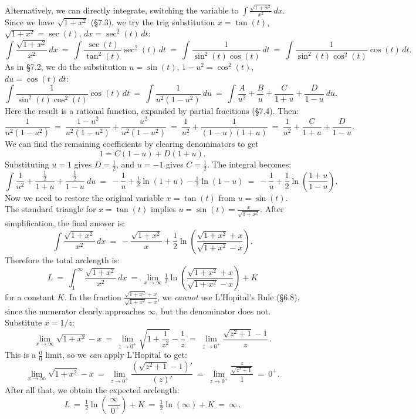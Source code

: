 \documentclass[11pt]{article}
\begin{document}
\newpage

\noindent
Alternatively, we can directly integrate, 
switching the variable to $\int\! \frac{\sqrt{1+x^2}}{x^2}\,dx$. 
Since we have $\sqrt{1{+}x^2}$ (\S7.3), we try the trig substitution 
$x = \tan(t)$, $\sqrt{1{+}x^2}=\sec(t)$, $dx = \sec^2(t)\,dt$:
$$
\int\! \frac{\sqrt{1+x^2}}{x^2}\,dx
\ =\ 
\int\! \frac{\sec(t)}{\tan^2(t)}\sec^2(t)\,dt
\ = \ 
\int\! \frac{1}{\sin^2(t)\cos(t)}\,dt
\ = \ 
\int\! \frac{1}{\sin^2(t)\cos^2(t)}\cos(t)\,dt.
$$
As in \S7.2, we do the substitution $u=\sin(t)$, $1{-}u^2 = \cos^2(t)$, $du = \cos(t)\,dt$:
$$
\int\! \frac{1}{\sin^2(t)\cos^2(t)}\cos(t)\,dt
\ =\ 
\int\! \frac{1}{u^2(1{-}u^2)}\ du 
\ =\ \int\! \frac{A}{u^2}+\frac{B}{u}+\frac{C}{1{+}u}+\frac{D}{1{-}u}\ du.
$$
Here the result is a rational function, expanded by partial fracitions (\S7.4).
Then: 
$$
\frac{1}{u^2(1{-}u^2)}
\ =\ 
 \frac{1{-}u^2}{u^2(1{-}u^2)} + \frac{u^2}{u^2(1{-}u^2)}
 \ =\ \frac{1}{u^2} + \frac{1}{(1{-}u)(1{+}u)}
  \ =\ \frac{1}{u^2} + \frac{C}{1{+}u}+\frac{D}{1{-}u}.
$$
We can find the remaining coefficients by clearing denominators to get 
$$1= C(1{-}u)+D(1{+}u).$$
Substituting $u = 1$ gives $D=\frac12$, and $u=-1$ gives $C=\frac12$.
The integral becomes:
$$
\int \frac{1}{u^2}+\frac{\frac12}{1{+}u}+\frac{\frac12}{1{-}u}\ du
\ =\ 
-\frac{1}{u} + \tfrac12 \ln(1{+}u) - \tfrac12 \ln(1{-}u)
\ =\ 
-\frac{1}{u} + \frac12 \ln\!\left(\frac{1{+}u}{1{-}u}\right).
$$
Now we need to restore the original variable $x=\tan(t)$ from $u=\sin(t)$.
The standard triangle for $x=\tan(t)$ implies $u=\sin(t) = \frac{x}{\sqrt{1+x^2}}$.
After simplification, the final answer is:
$$
\int\! \frac {\sqrt{1{+}x^2}} {x^2}\,dx
\ =\ -\frac{\sqrt{1{+}x^2}}x 
+ \frac12\ln\!\left(\!\frac {\sqrt{1{+}x^2}+x} {\sqrt{1{+}x^2}-x} \!\right).
$$
Therefore the total arclength is:
$$
L \ =\ 
\int_1^\infty\! \frac {\sqrt{1{+}x^2}} {x^2}\,dx
\ =\ 
\lim_{x\to\infty} \tfrac12   \ln\!\left(\!\frac {\sqrt{1{+}x^2}+x} {\sqrt{1{+}x^2}-x} \!\right)
+ K
$$
for a constant $K$.  In the fraction $\frac {\sqrt{1{+}x^2}+x} {\sqrt{1{+}x^2}-x}$, 
we {\it cannot} use L'Hopital's Rule (\S6.8), 
since the numerator clearly approaches $\infty$,
but the denominator does not. Substitute $x=1/z$:
$$
\lim_{x\to\infty} \sqrt{1{+}x^2}-x \ =\ 
\lim_{z\to0^+}\! \sqrt{1{+}\frac1{z^2}}-\frac 1z \ =\ 
\lim_{z\to0^+}\! \frac{\sqrt{z^2{+}1}-1}z\,. 
$$
This is a $\frac 00$ limit, so we {\it can} apply L'Hopital to get:
$$
\lim_{x\to\infty} \sqrt{1{+}x^2}-x 
\ =\ \lim_{z\to0^+}\! \frac{(\sqrt{z^2{+}1}-1)'}{(z)'}
\ =\ \lim\limits_{z\to0^+}\! \frac {\frac z{\sqrt{z^2+1}}}   {1} \ =\ 0^+. 
$$
After all that, we obtain the expected arclength:
$$
L \ =\ 
\tfrac12   \ln\!\left(\!\frac {\infty} {\ \,0^+} \!\right) + K \ =\ 
\tfrac12   \ln(\infty) + K \ =\ \infty\,.
$$
\end{document}
